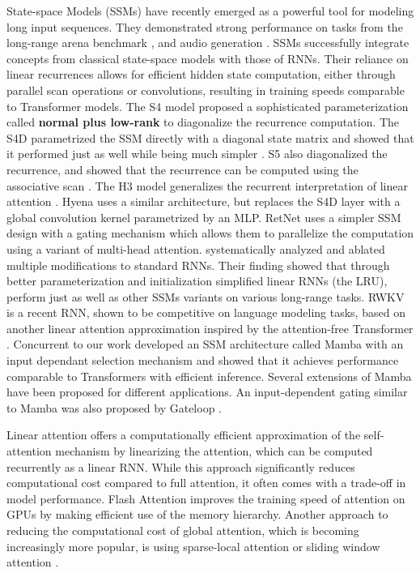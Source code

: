 \documentclass[11pt, a4paper, logo, onecolumn]{googledeepmind}
\theoremstyle{definition}
\begin{document}
State-space Models (SSMs) have recently emerged as a powerful tool for modeling long input sequences.
They demonstrated strong performance on tasks from the long-range arena benchmark \citep{tay2020long}, and audio generation \citep{goel2022s}.
SSMs successfully integrate concepts from classical state-space models \citep{kalman1960new} with those of RNNs. 
Their reliance on linear recurrences allows for efficient hidden state computation, either through parallel scan operations or convolutions, resulting in training speeds comparable to Transformer models. 
The S4 \citep{gu2021efficiently} model proposed a sophisticated parameterization called \textbf{normal plus low-rank} to diagonalize the recurrence computation.
The S4D parametrized the SSM directly with a diagonal state matrix and showed that it performed just as well while being much simpler \citep{gu2022parameterization}. S5 also diagonalized the recurrence, and showed that the recurrence can be computed using the associative scan \citep{smith2022simplified}.
The H3 model \citep{dao2022hungry} generalizes the recurrent interpretation of linear attention \citep{katharopoulos2020Transformers}.
Hyena \citep{poli2023hyena} uses a similar architecture, but replaces the S4D layer with a global convolution kernel parametrized by an MLP. 
RetNet \citep{sun2023retentive} uses a simpler SSM design with a gating mechanism which allows them to parallelize the computation using a variant of multi-head attention. 
\cite{orvieto2023resurrecting}  systematically analyzed and ablated multiple modifications to standard RNNs.
Their finding showed that through better parameterization and initialization simplified linear RNNs (the LRU), perform just as well as other SSMs variants on various long-range tasks. 
RWKV \citep{peng2023rwkv} is a recent RNN, shown to be competitive on language modeling tasks, based on another linear attention approximation inspired by the attention-free Transformer \citep{attention-free-Transformer}.
Concurrent to our work \cite{gu2023mamba} developed an SSM architecture called Mamba with an input dependant selection mechanism and showed that it achieves performance comparable to Transformers with efficient inference. Several extensions of Mamba have been proposed \citep{wang2024mambabyte,zhu2024vision} for different applications. An input-dependent gating similar to Mamba was also proposed by Gateloop \citep{katsch2023gateloop}.



Linear attention \citep{katharopoulos2020Transformers} offers a computationally efficient approximation of the self-attention mechanism by linearizing the attention, which 
can be computed recurrently as a linear RNN.
While this approach significantly reduces computational cost compared to full attention, it often comes with a trade-off in model performance. 
Flash Attention \citep{dao2022flashattention} improves the training speed of attention on GPUs by making efficient use of the memory hierarchy. 
Another approach to reducing the computational cost of global attention, which is becoming increasingly more popular, is using sparse-local attention \citep{child2019generating} or sliding window attention \citep{jiang2023mistral}.
\end{document}
